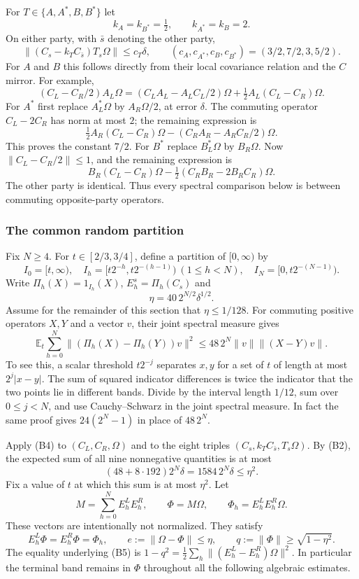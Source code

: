 For $T\in\{A,A^*,B,B^*\}$ let
\[
 k_A=k_{B^*}=\tfrac12,\qquad k_{A^*}=k_B=2.
\]
On either party, with $\bar s$ denoting the other party,
\[
 \|(C_s-k_TC_{\bar s})T_s\Omega\|\leq c_T\delta,
 \qquad(c_A,c_{A^*},c_B,c_{B^*})=(3/2,7/2,3,5/2). \tag{B2}
\]
For $A$ and $B$ this follows directly from their local covariance relation
and the $C$ mirror.  For example,
\[
 (C_L-C_R/2)A_L\Omega
 =(C_LA_L-A_LC_L/2)\Omega
   +\tfrac12A_L(C_L-C_R)\Omega.
\]
For $A^*$ first replace $A_L^*\Omega$ by $A_R\Omega/2$, at error
$\delta$.  The commuting operator $C_L-2C_R$ has norm at most $2$;
the remaining expression is
\[
 \tfrac12A_R(C_L-C_R)\Omega
  -(C_RA_R-A_RC_R/2)\Omega.
\]
This proves the constant $7/2$.  For $B^*$ replace $B_L^*\Omega$ by
$B_R\Omega$.  Now $\|C_L-C_R/2\|\leq1$, and the remaining expression is
\[
 B_R(C_L-C_R)\Omega
  -\tfrac12(C_RB_R-2B_RC_R)\Omega.
\]
The other party is identical.  Thus every spectral comparison below is
between commuting opposite-party operators.

\subsubsection{The common random partition}
Fix $N\geq4$.  For $t\in[2/3,3/4]$, define a partition of $[0,\infty)$ by
\[
 I_0=[t,\infty),\quad
 I_h=[t2^{-h},t2^{-(h-1)})\ (1\leq h<N),\quad
 I_N=[0,t2^{-(N-1)}).
\]
Write $\Pi_h(X)=1_{I_h}(X)$, $E_h^s=\Pi_h(C_s)$ and
\[
 \eta=40\,2^{N/2}\delta^{1/2}.                    \tag{B3}
\]
Assume for the remainder of this section that $\eta\leq1/128$.
For commuting positive operators $X,Y$ and a vector $v$, their joint
spectral measure gives
\[
 \mathbb E_t\sum_{h=0}^N
 \|(\Pi_h(X)-\Pi_h(Y))v\|^2
 \leq48\,2^N\|v\|\|(X-Y)v\|.                 \tag{B4}
\]
To see this, a scalar threshold $t2^{-j}$ separates $x,y$ for a set of
$t$ of length at most $2^j|x-y|$.  The sum of squared indicator
differences is twice the indicator that the two points lie in different
bands.  Divide by the interval length $1/12$, sum over $0\leq j<N$,
and use Cauchy--Schwarz in the joint spectral measure.  In fact the same
proof gives $24(2^N-1)$ in place of $48\,2^N$.

Apply (B4) to $(C_L,C_R,\Omega)$ and to the eight triples
$(C_s,k_TC_{\bar s},T_s\Omega)$.  By (B2), the expected sum of all nine
nonnegative quantities is at most
\[
 (48+8\cdot192)2^N\delta=1584\,2^N\delta\leq\eta^2.
\]
Fix a value of $t$ at which this sum is at most $\eta^2$.
Let
\[
 M=\sum_{h=0}^NE_h^LE_h^R,\qquad
 \Phi=M\Omega,\qquad\Phi_h=E_h^LE_h^R\Omega.
\]
These vectors are intentionally not normalized.  They satisfy
\[
 E_h^L\Phi=E_h^R\Phi=\Phi_h,\qquad
 e:=\|\Omega-\Phi\|\leq\eta,\qquad
 q:=\|\Phi\|\geq\sqrt{1-\eta^2}.                \tag{B5}
\]
The equality underlying (B5) is
$1-q^2=\frac12\sum_h\|(E_h^L-E_h^R)\Omega\|^2$.
In particular the terminal band remains in $\Phi$ throughout all the
following algebraic estimates.

